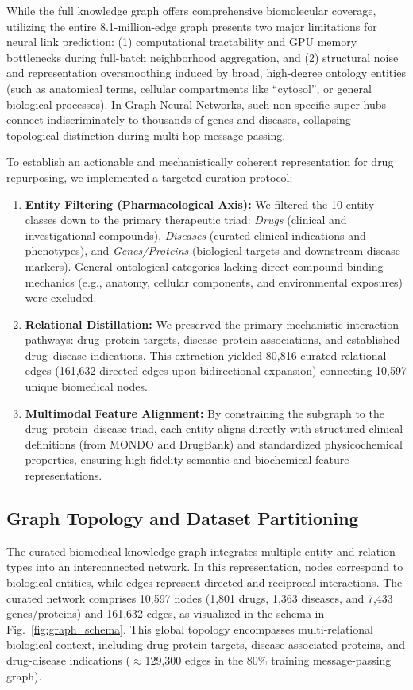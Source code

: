 \documentclass[preprint,12pt]{elsarticle}
\begin{document}
While the full knowledge graph offers comprehensive biomolecular coverage, utilizing the entire 8.1-million-edge graph presents two major limitations for neural link prediction: (1) computational tractability and GPU memory bottlenecks during full-batch neighborhood aggregation, and (2) structural noise and representation oversmoothing induced by broad, high-degree ontology entities (such as anatomical terms, cellular compartments like ``cytosol'', or general biological processes). In Graph Neural Networks, such non-specific super-hubs connect indiscriminately to thousands of genes and diseases, collapsing topological distinction during multi-hop message passing.

To establish an actionable and mechanistically coherent representation for drug repurposing, we implemented a targeted curation protocol:
\begin{enumerate}
    \item \textbf{Entity Filtering (Pharmacological Axis):} We filtered the 10 entity classes down to the primary therapeutic triad: \textit{Drugs} (clinical and investigational compounds), \textit{Diseases} (curated clinical indications and phenotypes), and \textit{Genes/Proteins} (biological targets and downstream disease markers). General ontological categories lacking direct compound-binding mechanics (e.g., anatomy, cellular components, and environmental exposures) were excluded.
    \item \textbf{Relational Distillation:} We preserved the primary mechanistic interaction pathways: drug--protein targets, disease--protein associations, and established drug--disease indications. This extraction yielded 80,816 curated relational edges (161,632 directed edges upon bidirectional expansion) connecting 10,597 unique biomedical nodes.
    \item \textbf{Multimodal Feature Alignment:} By constraining the subgraph to the drug--protein--disease triad, each entity aligns directly with structured clinical definitions (from MONDO and DrugBank) and standardized physicochemical properties, ensuring high-fidelity semantic and biochemical feature representations.
\end{enumerate}

\subsection{Graph Topology and Dataset Partitioning}
The curated biomedical knowledge graph integrates multiple entity and relation types into an interconnected network. In this representation, nodes correspond to biological entities, while edges represent directed and reciprocal interactions. The curated network comprises 10,597 nodes (1,801 drugs, 1,363 diseases, and 7,433 genes/proteins) and 161,632 edges, as visualized in the schema in Fig.~\ref{fig:graph_schema}. This global topology encompasses multi-relational biological context, including drug-protein targets, disease-associated proteins, and drug-disease indications ($\approx$129,300 edges in the 80\% training message-passing graph).
\end{document}
